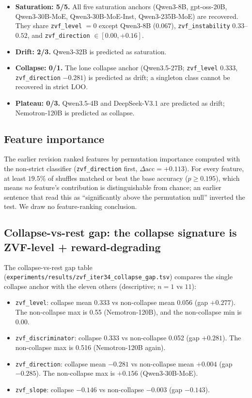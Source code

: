 \begin{itemize}
\item \textbf{Saturation: 5/5.} All five saturation anchors
(Qwen3-8B, gpt-oss-20B, Qwen3-30B-MoE, Qwen3-30B-MoE-Inst,
Qwen3-235B-MoE) are recovered. They share \texttt{zvf\_level} $=0$ except
Qwen3-8B ($0.067$), \texttt{zvf\_instability} $0.33$--$0.52$, and
\texttt{zvf\_direction} $\in [0.00, +0.16]$.
\item \textbf{Drift: 2/3.} Qwen3-32B is predicted as saturation.
\item \textbf{Collapse: 0/1.} The lone collapse anchor (Qwen3.5-27B;
\texttt{zvf\_level} $0.333$, \texttt{zvf\_direction} $-0.281$) is predicted as
drift; a singleton class cannot be recovered in strict LOO.
\item \textbf{Plateau: 0/3.} Qwen3.5-4B and DeepSeek-V3.1 are predicted as
drift; Nemotron-120B is predicted as collapse.
\end{itemize}

\subsection{Feature importance}
\label{sec:zvf-iter34-importance}

The earlier revision ranked features by permutation importance computed with
the non-strict classifier (\texttt{zvf\_direction} first, $\Delta
\text{acc}=+0.113$). For every feature, at least $19.5\%$ of shuffles matched or
beat the base accuracy ($p\ge0.195$), which means \emph{no} feature's
contribution is distinguishable from chance; an earlier sentence that read
this as ``significantly above the permutation null'' inverted the test. We
draw no feature-ranking conclusion.

\subsection{Collapse-vs-rest gap: the collapse signature is
ZVF-level + reward-degrading}
\label{sec:zvf-iter34-collapse}

The collapse-vs-rest gap table
(\texttt{experiments/results/zvf\_iter34\_collapse\_gap.tsv}) compares the
single collapse anchor with the eleven others (descriptive; $n=1$ vs $11$):

\begin{itemize}
\item \texttt{zvf\_level}: collapse mean 0.333 vs non-collapse mean
0.056 (gap $+0.277$). The non-collapse max is 0.55
(Nemotron-120B), and the non-collapse min is 0.00.
\item \texttt{zvf\_discriminator}: collapse 0.333 vs non-collapse
0.052 (gap $+0.281$). The non-collapse max is 0.516
(Nemotron-120B again).
\item \texttt{zvf\_direction}: collapse mean $-0.281$ vs
non-collapse mean $+0.004$ (gap $-0.285$). The non-collapse max
is $+0.156$ (Qwen3-30B-MoE).
\item \texttt{zvf\_slope}: collapse $-0.146$ vs non-collapse
$-0.003$ (gap $-0.143$).
\end{itemize}

